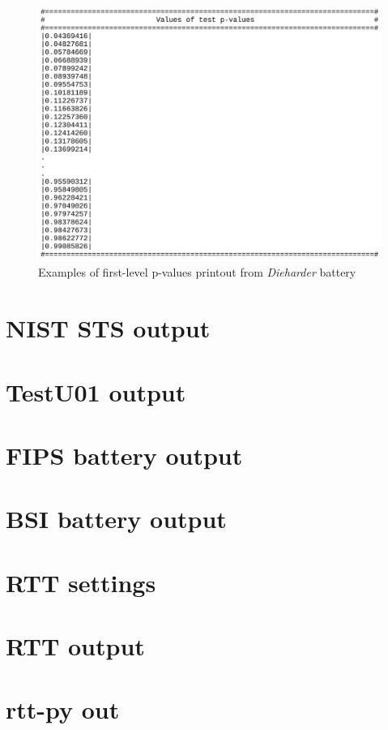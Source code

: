 \documentclass[
  digital,     %
  oneside,     %
  nosansbold,  %
  nocolorbold, %
  nolof,         %
  nolot,         %
]{fithesis4}
\begin{document}
\begin{figure}
  \begin{center}
    \includegraphics[width=12cm]{figures/outputs-appendix/pvals.jpg}
  \end{center}
  \caption{Examples of first-level p-values printout from \emph{Dieharder} battery}
  \label{die_pvals}
\end{figure}

\chapter{NIST STS output} \label{append:nist-output}

\chapter{TestU01 output} \label{append:tu01-output}

\chapter{FIPS battery output} \label{append:fips-output}

\chapter{BSI battery output} \label{append:bsi-output}

\chapter{RTT settings} \label{append:rtt-setting}

\chapter{RTT output} \label{append:rtt-output}


\chapter{rtt-py out} \label{append:rtt-py-output}
\end{document}
